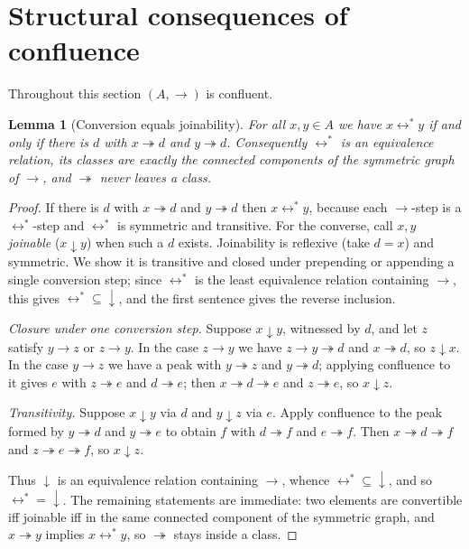 \documentclass{amsart}
\newtheorem{lemma}{Lemma}
\theoremstyle{definition}
\theoremstyle{remark}
\newcommand{\redto}{\rightarrow}
\newcommand{\redtt}{\twoheadrightarrow}
\newcommand{\conv}{\leftrightarrow^{*}}
\begin{document}
\section{Structural consequences of confluence}\label{sec:struct}

Throughout this section $(A,\redto)$ is confluent.

\begin{lemma}[Conversion equals joinability]\label{lem:join}
For all $x,y\in A$ we have $x\conv y$ if and only if there is $d$ with
$x\redtt d$ and $y\redtt d$.  Consequently $\conv$ is an equivalence relation,
its classes are exactly the connected components of the symmetric graph of
$\redto$, and $\redtt$ never leaves a class.
\end{lemma}

\begin{proof}
If there is $d$ with $x\redtt d$ and $y\redtt d$ then $x\conv y$, because each
$\redto$-step is a $\conv$-step and $\conv$ is symmetric and transitive.  For
the converse, call $x,y$ \emph{joinable} ($x\downarrow y$) when such a $d$
exists.  Joinability is reflexive (take $d=x$) and symmetric.  We show it is
transitive and closed under prepending or appending a single conversion step;
since $\conv$ is the least equivalence relation containing $\redto$, this gives
$\conv{}\subseteq{}\downarrow$, and the first sentence gives the reverse
inclusion.

\emph{Closure under one conversion step.}  Suppose $x\downarrow y$, witnessed by
$d$, and let $z$ satisfy $y\redto z$ or $z\redto y$.  In the case $z\redto y$ we
have $z\redto y\redtt d$ and $x\redtt d$, so $z\downarrow x$.  In the case
$y\redto z$ we have a peak with $y\redtt z$ and $y\redtt d$; applying confluence
to it gives $e$ with $z\redtt e$ and $d\redtt e$; then $x\redtt d\redtt e$ and
$z\redtt e$, so $x\downarrow z$.

\emph{Transitivity.}  Suppose $x\downarrow y$ via $d$ and $y\downarrow z$ via
$e$.  Apply confluence to the peak formed by $y\redtt d$ and $y\redtt e$ to
obtain $f$ with $d\redtt f$ and $e\redtt f$.  Then $x\redtt d\redtt f$ and
$z\redtt e\redtt f$, so $x\downarrow z$.

Thus $\downarrow$ is an equivalence relation containing $\redto$, whence
$\conv\subseteq\downarrow$, and so $\conv=\downarrow$.  The remaining statements
are immediate: two elements are convertible iff joinable iff in the same
connected component of the symmetric graph, and $x\redtt y$ implies $x\conv y$,
so $\redtt$ stays inside a class.
\end{proof}
\end{document}
